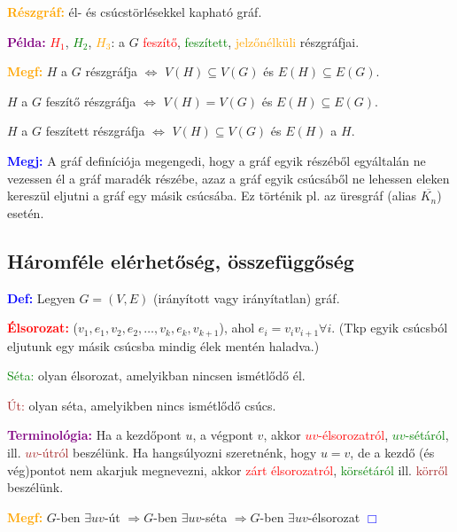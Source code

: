 \documentclass[../szamtud.tex]{subfiles}
\begin{document}
        \textcolor{orange}{\textbf{Részgráf:}} él- és csúcstörlésekkel kapható gráf.

        \textcolor{purple}{\textbf{Példa:}} \textcolor{red}{$H_1$}, \textcolor{green}{$H_2$}, \textcolor{orange}{$H_3$}: a $G$ \textcolor{red}{feszítő}, \textcolor{green}{feszített}, \textcolor{orange}{jelzőnélküli} részgráfjai.

        \textcolor{orange}{\textbf{Megf:}} $H$ a $G$ részgráfja $\Longleftrightarrow$ $V(H) \subseteq V(G)$ és $E(H) \subseteq E(G)$.

        $H$ a $G$ feszítő részgráfja $\Longleftrightarrow$ $V(H) = V(G)$ és $E(H) \subseteq E(G)$.

        $H$ a $G$ feszített részgráfja $\Longleftrightarrow$ $V(H) \subseteq V(G)$ és $E(H)$ a $H$.

        \textcolor{blue}{\textbf{Megj:}} A gráf definíciója megengedi, hogy a gráf egyik részéből egyáltalán ne vezessen él a gráf maradék részébe, azaz a gráf egyik csúcsáből ne lehessen eleken kereszül eljutni a gráf egy másik csúcsába. Ez történik pl. az üresgráf (alias $\overline{K_n}$) esetén.

    \subsection{Háromféle elérhetőség, összefüggőség}

        \textcolor{blue}{\textbf{Def:}} Legyen $G = (V,E)$ (irányított vagy irányítatlan) gráf.

        \textcolor{red}{\textbf{Élsorozat:}} ($v_1,e_1,v_2,e_2,\dots,v_k,e_k,v_{k+1}$), ahol $e_i=v_i v_{i+1}\forall i$. (Tkp egyik csúcsból eljutunk egy másik csúcsba mindig élek mentén haladva.)

        \textcolor{green}{Séta:} olyan élsorozat, amelyikban nincsen ismétlődő él.

        \textcolor{brown}{Út:} olyan séta, amelyikben nincs ismétlődő csúcs.

        \textcolor{purple}{\textbf{Terminológia:}} Ha a kezdőpont $u$, a végpont $v$, akkor \textcolor{red}{$uv$-élsorozatról}, \textcolor{green}{$uv$-sétáról}, ill. \textcolor{brown}{$uv$-útról} beszélünk. Ha hangsúlyozni szeretnénk, hogy $u = v$, de a kezdő (és vég)pontot nem akarjuk megnevezni, akkor \textcolor{red}{zárt élsorozatról}, \textcolor{green}{körsétáról} ill. \textcolor{brown}{körről} beszélünk.

        \textcolor{orange}{\textbf{Megf:}} $G$-ben $\exists uv$-út $\Rightarrow G$-ben $\exists uv$-séta $\Rightarrow G$-ben $\exists uv$-élsorozat \textcolor{blue}{$\Box$}
\end{document}
